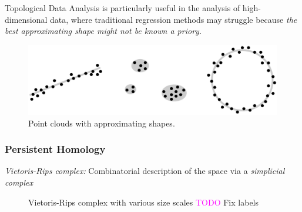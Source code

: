 \documentclass[11pt, a4paper]{amsart}
\begin{document}
Topological Data Analysis is particularly useful in the analysis of high-dimensional data, where traditional regression methods may struggle because \emph{the best approximating shape might not be known a priory.}

\begin{figure}
	\centering
	\includegraphics[width=0.95\linewidth]{figures/topological_data_analysis/topological_data_analysis_collection_with_shapes}
	\caption{
		Point clouds with approximating shapes.
		\label{fig:topological_data_analysis_collection_with_shapes}
	}
\end{figure}

\subsubsection{Persistent Homology}

\emph{Vietoris-Rips complex:} 
Combinatorial description of the space via a \emph{simplicial complex}

\begin{center}
	\begin{figure}
		\centering
		\caption{
			Vietoris-Rips complex with various size scales
			\textcolor{magenta}{TODO} Fix labels
			\label{fig:vietoris_rips_complex}
		}
	\end{figure}
\end{center}
\end{document}
